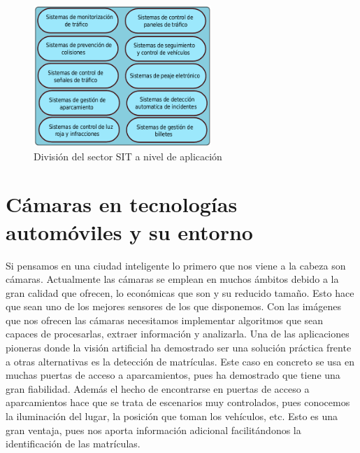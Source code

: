\begin{figure}[H]
  \begin{center}
    \includegraphics[width=0.6\textwidth]{figures/Introduccion/Division_SIT.png}
		\caption{División del sector SIT a nivel de aplicación}
		\label{fig.division_SIT}
		\end{center}
\end{figure}

\section{Cámaras en tecnologías automóviles y su entorno}

Si pensamos en una ciudad inteligente lo primero que nos viene a la cabeza son cámaras. Actualmente las cámaras se emplean en muchos ámbitos debido a la gran calidad que ofrecen, lo económicas que son y su reducido tamaño. Esto hace que sean uno de los mejores sensores de los que disponemos. Con las imágenes que nos ofrecen las cámaras necesitamos implementar algoritmos que sean capaces de procesarlas, extraer información y analizarla. Una de las aplicaciones pioneras donde la visión artificial ha demostrado ser una solución práctica frente a otras alternativas es la detección de matrículas. Este caso en concreto se usa en muchas puertas de acceso a aparcamientos, pues ha demostrado que tiene una gran fiabilidad. Además el hecho de encontrarse en puertas de acceso a aparcamientos hace que se trata de escenarios muy controlados, pues conocemos la iluminación del lugar, la posición que toman los vehículos, etc. Esto es una gran ventaja, pues nos aporta información adicional facilitándonos la identificación de las matrículas.

